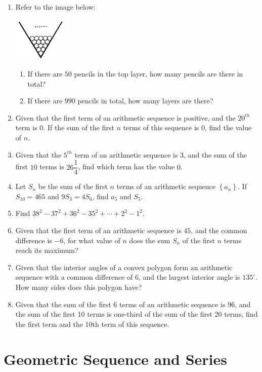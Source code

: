 \documentclass{report}
\begin{document}
\begin{enumerate}
        \item Refer to the image below:
        \begin{center}
            \includegraphics[width=0.2\textwidth]{assets/13-5.jpg}
        \end{center}
        \begin{enumerate}
            \item If there are $50$ pencils in the top layer, how many pencils are there in total?
            \item If there are $990$ pencils in total, how many layers are there?
        \end{enumerate}
        \item Given that the first term of an arithmetic sequence is positive, and the $20^{th}$ term is $0$. If the sum of the first $n$ terms of this sequence is $0$, find the value of $n$.
        \item Given that the $5^{th}$ term of an arithmetic sequence is $3$, and the sum of the first $10$ terms is $26 \dfrac{1}{4}$, find which term has the value $0$.
        \item Let $S_{n}$ be the sum of the first $n$ terms of an arithmetic sequence $\left\{a_{n}\right\}$. If $S_{10}=465$ and $9 S_{3}=4 S_{6}$, find $a_{5}$ and $S_{5}$.
        \item Find $38^{2}-37^{2}+36^{2}-35^{2}+\cdots+2^{2}-1^{2}$.
        \item Given that the first term of an arithmetic sequence is $45$, and the common difference is $-6$, for what value of $n$ does the sum $S_{n}$ of the first $n$ terms reach its maximum?
        \item Given that the interior angles of a convex polygon form an arithmetic sequence with a common difference of 6, and the largest interior angle is $135^{\circ}$. How many sides does this polygon have?
        \item Given that the sum of the first 6 terms of an arithmetic sequence is 96, and the sum of the first 10 terms is one-third of the sum of the first 20 terms, find the first term and the 10th term of this sequence.
        \end{enumerate}

        \newpage
        \section{Geometric Sequence and Series}
\end{document}
